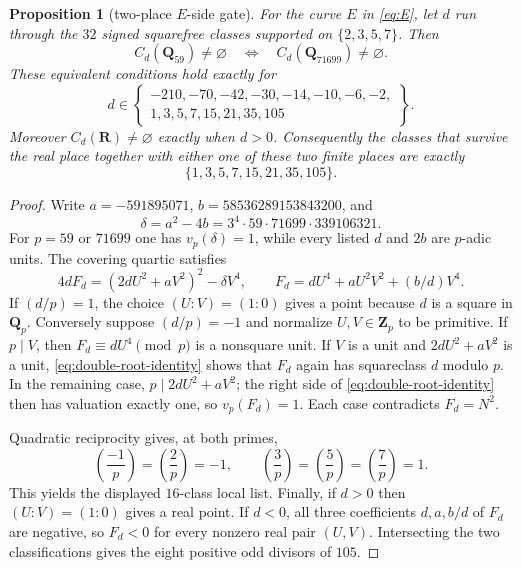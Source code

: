 \documentclass[11pt]{article}
\newtheorem{proposition}[theorem]{Proposition}
\begin{document}
\begin{proposition}[two-place $E$-side gate]\label{prop:two-place-gate}
For the curve $E$ in \eqref{eq:E}, let $d$ run through the $32$ signed
squarefree classes supported on $\{2,3,5,7\}$.  Then
\[
 C_d(\mathbf Q_{59})\ne\varnothing
 \quad\Longleftrightarrow\quad
 C_d(\mathbf Q_{71699})\ne\varnothing.
\]
These equivalent conditions hold exactly for
\[
 d\in\left\{
 \begin{gathered}
 -210,-70,-42,-30,-14,-10,-6,-2,\\
 1,3,5,7,15,21,35,105
 \end{gathered}
 \right\}.
\]
Moreover $C_d(\mathbf R)\ne\varnothing$ exactly when $d>0$.
Consequently the classes that survive the real place together with either
one of these two finite places are exactly
\[
 \{1,3,5,7,15,21,35,105\}.
\]
\end{proposition}
\begin{proof}
Write $a=-591895071$, $b=58536289153843200$, and
\[
 \delta=a^2-4b=3^4\cdot59\cdot71699\cdot339106321.
\]
For $p=59$ or $71699$ one has $v_p(\delta)=1$, while every listed $d$
and $2b$ are $p$-adic units.  The covering quartic satisfies
\begin{equation}\label{eq:double-root-identity}
 4dF_d=(2dU^2+aV^2)^2-\delta V^4,
 \qquad F_d=dU^4+aU^2V^2+(b/d)V^4.
\end{equation}
If $(d/p)=1$, the choice $(U:V)=(1:0)$ gives a point because $d$ is a
square in $\mathbf Q_p$.  Conversely suppose $(d/p)=-1$ and normalize
$U,V\in\mathbf Z_p$ to be primitive.  If $p\mid V$, then
$F_d\equiv dU^4\pmod p$ is a nonsquare unit.  If $V$ is a unit and
$2dU^2+aV^2$ is a unit, \eqref{eq:double-root-identity} shows that
$F_d$ again has squareclass $d$ modulo $p$.  In the remaining case,
$p\mid2dU^2+aV^2$; the right side of
\eqref{eq:double-root-identity} then has valuation exactly one, so
$v_p(F_d)=1$.  Each case contradicts $F_d=N^2$.

Quadratic reciprocity gives, at both primes,
\[
 \left(\frac{-1}{p}\right)=
 \left(\frac{2}{p}\right)=-1,\qquad
 \left(\frac{3}{p}\right)=
 \left(\frac{5}{p}\right)=
 \left(\frac{7}{p}\right)=1.
\]
This yields the displayed $16$-class local list.  Finally, if $d>0$ then
$(U:V)=(1:0)$ gives a real point.  If $d<0$, all three coefficients
$d,a,b/d$ of $F_d$ are negative, so $F_d<0$ for every nonzero real pair
$(U,V)$.  Intersecting the two classifications gives the eight positive
odd divisors of $105$.
\end{proof}
\end{document}
